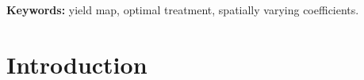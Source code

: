 \documentclass[a4paper]{article} 	%
\begin{document}
\begin{abstract}




\end{abstract}



 
{\bf Keywords:} yield map, optimal treatment, spatially varying coefficients. 

\section{Introduction}\label{Sec:Intro}
\end{document}
